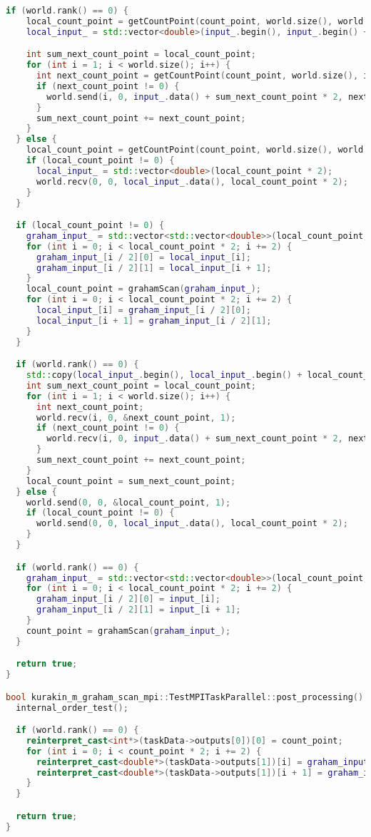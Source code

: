 \documentclass[12pt]{article}
\begin{document}
\begin{lstlisting}[language=C++]
  if (world.rank() == 0) {
    local_count_point = getCountPoint(count_point, world.size(), world.rank());
    local_input_ = std::vector<double>(input_.begin(), input_.begin() + local_count_point * 2);

    int sum_next_count_point = local_count_point;
    for (int i = 1; i < world.size(); i++) {
      int next_count_point = getCountPoint(count_point, world.size(), i);
      if (next_count_point != 0) {
        world.send(i, 0, input_.data() + sum_next_count_point * 2, next_count_point * 2);
      }
      sum_next_count_point += next_count_point;
    }
  } else {
    local_count_point = getCountPoint(count_point, world.size(), world.rank());
    if (local_count_point != 0) {
      local_input_ = std::vector<double>(local_count_point * 2);
      world.recv(0, 0, local_input_.data(), local_count_point * 2);
    }
  }

  if (local_count_point != 0) {
    graham_input_ = std::vector<std::vector<double>>(local_count_point, std::vector<double>(2, 0));
    for (int i = 0; i < local_count_point * 2; i += 2) {
      graham_input_[i / 2][0] = local_input_[i];
      graham_input_[i / 2][1] = local_input_[i + 1];
    }
    local_count_point = grahamScan(graham_input_);
    for (int i = 0; i < local_count_point * 2; i += 2) {
      local_input_[i] = graham_input_[i / 2][0];
      local_input_[i + 1] = graham_input_[i / 2][1];
    }
  }

  if (world.rank() == 0) {
    std::copy(local_input_.begin(), local_input_.begin() + local_count_point * 2, input_.begin());
    int sum_next_count_point = local_count_point;
    for (int i = 1; i < world.size(); i++) {
      int next_count_point;
      world.recv(i, 0, &next_count_point, 1);
      if (next_count_point != 0) {
        world.recv(i, 0, input_.data() + sum_next_count_point * 2, next_count_point * 2);
      }
      sum_next_count_point += next_count_point;
    }
    local_count_point = sum_next_count_point;
  } else {
    world.send(0, 0, &local_count_point, 1);
    if (local_count_point != 0) {
      world.send(0, 0, local_input_.data(), local_count_point * 2);
    }
  }

  if (world.rank() == 0) {
    graham_input_ = std::vector<std::vector<double>>(local_count_point, std::vector<double>(2, 0));
    for (int i = 0; i < local_count_point * 2; i += 2) {
      graham_input_[i / 2][0] = input_[i];
      graham_input_[i / 2][1] = input_[i + 1];
    }
    count_point = grahamScan(graham_input_);
  }

  return true;
}

bool kurakin_m_graham_scan_mpi::TestMPITaskParallel::post_processing() {
  internal_order_test();

  if (world.rank() == 0) {
    reinterpret_cast<int*>(taskData->outputs[0])[0] = count_point;
    for (int i = 0; i < count_point * 2; i += 2) {
      reinterpret_cast<double*>(taskData->outputs[1])[i] = graham_input_[i / 2][0];
      reinterpret_cast<double*>(taskData->outputs[1])[i + 1] = graham_input_[i / 2][1];
    }
  }

  return true;
}

\end{lstlisting}
\end{document}
